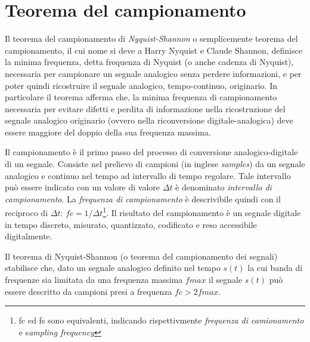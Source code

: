 
\section{Teorema del campionamento}

Il teorema del campionamento di \emph{Nyquist-Shannon} o semplicemente teorema del
campionamento, il cui nome si deve a Harry Nyquist e
Claude Shannon, definisce la minima frequenza, detta
frequenza di Nyquist (o anche cadenza di Nyquist), necessaria per campionare un
segnale analogico senza perdere informazioni, e per poter quindi ricostruire il
segnale analogico, tempo-continuo, originario.
In particolare il teorema afferma che,
la minima frequenza di campionamento necessaria per evitare difetti e perdita di
informazione nella ricostruzione del segnale analogico originario (ovvero nella
riconversione digitale-analogica) deve essere maggiore del doppio della sua
frequenza massima.

Il campionamento è il primo passo del processo di conversione analogico-digitale
di un segnale. Consiste nel prelievo di campioni (in inglese \emph{samples}) da
un segnale analogico e continuo nel tempo ad intervallo di tempo regolare.
Tale intervallo può essere indicato con un valore di valore $\Delta t$ è denominato
\emph{intervallo di campionamento}. La \emph{frequenza di campionamento} è
descrivibile quindi con il reciproco di
$ \Delta t $: $ fc = 1/\Delta t $\footnote{fc ed fs sono equivalenti,
indicando rispettivmente \emph{frequenza di camionamento} e s\emph{ampling frequency}}.
Il risultato del campionamento è un segnale digitale in tempo discreto,
misurato, quantizzato, codificato e reso accessibile digitalmente.

Il teorema di Nyquist-Shannon (o teorema del campionamento dei segnali) stabilisce
che, dato un segnale analogico definito nel tempo $s(t)$ la cui banda di frequenze
sia limitata da una frequenza massima $fmax$ il segnale $s(t)$ può essere descritto
da campioni presi a frequenza $fc > 2fmax$.

\clearpage
